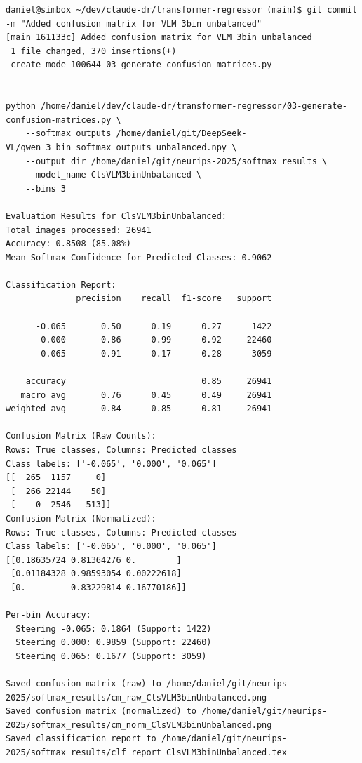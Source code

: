 \begin{verbatim}
daniel@simbox ~/dev/claude-dr/transformer-regressor (main)$ git commit -m "Added confusion matrix for VLM 3bin unbalanced"
[main 161133c] Added confusion matrix for VLM 3bin unbalanced
 1 file changed, 370 insertions(+)
 create mode 100644 03-generate-confusion-matrices.py


python /home/daniel/dev/claude-dr/transformer-regressor/03-generate-confusion-matrices.py \
    --softmax_outputs /home/daniel/git/DeepSeek-VL/qwen_3_bin_softmax_outputs_unbalanced.npy \
    --output_dir /home/daniel/git/neurips-2025/softmax_results \
    --model_name ClsVLM3binUnbalanced \
    --bins 3

Evaluation Results for ClsVLM3binUnbalanced:
Total images processed: 26941
Accuracy: 0.8508 (85.08%)
Mean Softmax Confidence for Predicted Classes: 0.9062

Classification Report:
              precision    recall  f1-score   support

      -0.065       0.50      0.19      0.27      1422
       0.000       0.86      0.99      0.92     22460
       0.065       0.91      0.17      0.28      3059

    accuracy                           0.85     26941
   macro avg       0.76      0.45      0.49     26941
weighted avg       0.84      0.85      0.81     26941

Confusion Matrix (Raw Counts):
Rows: True classes, Columns: Predicted classes
Class labels: ['-0.065', '0.000', '0.065']
[[  265  1157     0]
 [  266 22144    50]
 [    0  2546   513]]
Confusion Matrix (Normalized):
Rows: True classes, Columns: Predicted classes
Class labels: ['-0.065', '0.000', '0.065']
[[0.18635724 0.81364276 0.        ]
 [0.01184328 0.98593054 0.00222618]
 [0.         0.83229814 0.16770186]]

Per-bin Accuracy:
  Steering -0.065: 0.1864 (Support: 1422)
  Steering 0.000: 0.9859 (Support: 22460)
  Steering 0.065: 0.1677 (Support: 3059)

Saved confusion matrix (raw) to /home/daniel/git/neurips-2025/softmax_results/cm_raw_ClsVLM3binUnbalanced.png
Saved confusion matrix (normalized) to /home/daniel/git/neurips-2025/softmax_results/cm_norm_ClsVLM3binUnbalanced.png
Saved classification report to /home/daniel/git/neurips-2025/softmax_results/clf_report_ClsVLM3binUnbalanced.tex


    
\end{verbatim}

